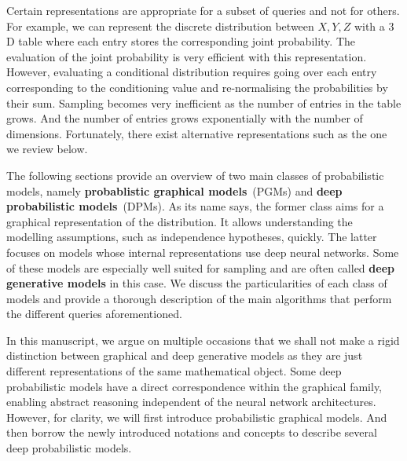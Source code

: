 Certain representations are appropriate for a subset of queries and not for others. For example, we can represent the discrete distribution between $X, Y, Z$ with a $3$D table where each entry stores the corresponding joint probability. The evaluation of the joint probability is very efficient with this representation. However, evaluating a conditional distribution requires going over each entry corresponding to the conditioning value and re-normalising the probabilities by their sum. Sampling becomes very inefficient as the number of entries in the table grows. And the number of entries grows exponentially with the number of dimensions. Fortunately, there exist alternative representations such as the one we review below.

The following sections provide an overview of two main classes of probabilistic models, namely \textbf{probablistic graphical models}~(PGMs) and \textbf{deep probabilistic models}~(DPMs). As its name says, the former class aims for a graphical representation of the distribution. It allows understanding the modelling assumptions, such as independence hypotheses, quickly. The latter focuses on models whose internal representations use deep neural networks. Some of these models are especially well suited for sampling and are often called \textbf{deep generative models} in this case. We discuss the particularities of each class of models and provide a thorough description of the main algorithms that perform the different queries aforementioned.

In this manuscript, we argue on multiple occasions that we shall not make a rigid distinction between graphical and deep generative models as they are just different representations of the same mathematical object. Some deep probabilistic models have a direct correspondence within the graphical family, enabling abstract reasoning independent of the neural network architectures. However, for clarity, we will first introduce probabilistic graphical models. And then borrow the newly introduced notations and concepts to describe several deep probabilistic models.


